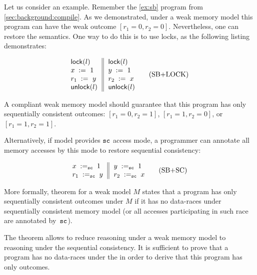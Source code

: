Let us consider an example. 
Remember the \ref{ex:sb} program from \cref{sec:background:compile}.
As we demonstrated, under a weak memory model 
this program can have the weak outcome ${[r_1=0, r_2=0]}$.
Nevertheless, one can restore the \SC semantics.
One way to do this is to use locks, as the following listing demonstrates:

\begin{equation*}
\inarrII{
   \lockInst{l}         \\
   \writeInst{}{x}{1}   \\
   \readInst{}{r_1}{y}  \\
   \unlockInst{l}       \\
}{
   \lockInst{l}         \\
   \writeInst{}{y}{1}   \\
   \readInst{}{r_2}{x}  \\
   \unlockInst{l}       \\
}
\tag{SB+LOCK}\label{ex:sb-lock}
\end{equation*}

A \DRF compliant weak memory model should guarantee 
that this program has only sequentially consistent outcomes:
${[r_1=0, r_2=1]}$, ${[r_1=1,r_2=0]}$, or ${[r_1=1,r_2=1]}$.

Alternatively, if model provides ${\mathtt{sc}}$ access mode, 
a programmer can annotate all memory accesses by this mode
to restore sequential consistency:  
 
\begin{equation*}
\inarrII{
   \writeInst{\sco}{x}{1}   \\
   \readInst{\sco}{r_1}{y}  \\
}{
   \writeInst{\sco}{y}{1}   \\
   \readInst{\sco}{r_2}{x}  \\
}
\tag{SB+SC}\label{ex:sb-sc}
\end{equation*}

More formally, \DRF theorem for a weak model $M$ states that 
a program has only sequentially consistent outcomes under $M$
if it has no data-races under sequentially consistent memory model
(or all accesses participating in such race are annotated by~${\mathtt{sc}}$).

The \DRF theorem allows to reduce reasoning under a weak memory model
to reasoning under the sequential consistency.
It is sufficient to prove that a program has no data-races under the \SC
in order to derive that this program has only \SC outcomes. 

